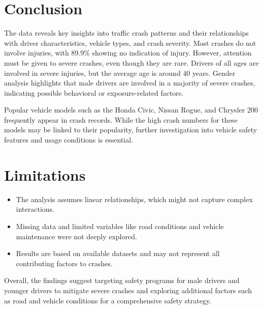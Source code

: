 \documentclass[a4paper,10pt]{article}
\begin{document}
\section{Conclusion}

The data reveals key insights into traffic crash patterns and their relationships with driver characteristics, vehicle types, and crash severity. Most crashes do not involve injuries, with 89.9\% showing no indication of injury. However, attention must be given to severe crashes, even though they are rare. Drivers of all ages are involved in severe injuries, but the average age is around 40 years. Gender analysis highlights that male drivers are involved in a majority of severe crashes, indicating possible behavioral or exposure-related factors.

Popular vehicle models such as the Honda Civic, Nissan Rogue, and Chrysler 200 frequently appear in crash records. While the high crash numbers for these models may be linked to their popularity, further investigation into vehicle safety features and usage conditions is essential.

\section*{Limitations}
\begin{itemize}
    \item The analysis assumes linear relationships, which might not capture complex interactions.
    \item Missing data and limited variables like road conditions and vehicle maintenance were not deeply explored.
    \item Results are based on available datasets and may not represent all contributing factors to crashes.
\end{itemize}

Overall, the findings suggest targeting safety programs for male drivers and younger drivers to mitigate severe crashes and exploring additional factors such as road and vehicle conditions for a comprehensive safety strategy.


% 


% 
\end{document}

